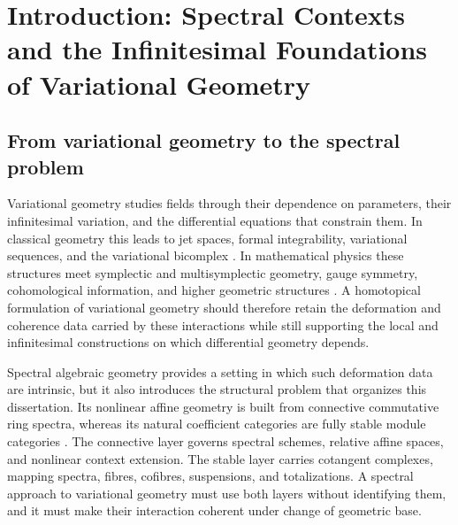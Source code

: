 \begingroup

\chapter*{Introduction: Spectral Contexts and the Infinitesimal Foundations of Variational Geometry}
{}

\setcounter{section}{0}
\renewcommand{\thesection}{\arabic{section}}
\makeatletter
{}
\makeatother


\section{From variational geometry to the spectral problem}
\label{sec:intro-programme}

Variational geometry studies fields through their dependence on parameters,
their infinitesimal variation, and the differential equations that constrain
them.  In classical geometry this leads to jet spaces, formal integrability,
variational sequences, and the variational bicomplex
\cite{Kock1980,Marvan1986,Vitolo2000,GiachettaMangiarottiSardanashvily2000,PuglieseSparanoVitagliano2023}.
In mathematical physics these structures meet symplectic and multisymplectic
geometry, gauge symmetry, cohomological information, and higher geometric
structures
\cite{Rogers2012,PTVV2013,Calaque2013,FiorenzaSatiSchreiber2013,FiorenzaRogersSchreiber2013,AlfonsiYoung2023}.
A homotopical formulation of variational geometry should therefore retain the
deformation and coherence data carried by these interactions while still
supporting the local and infinitesimal constructions on which differential
geometry depends.

Spectral algebraic geometry provides a setting in which such deformation data
are intrinsic, but it also introduces the structural problem that organizes
this dissertation.  Its nonlinear affine geometry is built from connective
commutative ring spectra, whereas its natural coefficient categories are
fully stable module categories
\cite{LurieHigherAlgebra,LurieSAG}.  The connective layer governs spectral
schemes, relative affine spaces, and nonlinear context extension.  The stable
layer carries cotangent complexes, mapping spectra, fibres, cofibres,
suspensions, and totalizations.  A spectral approach to variational geometry
must use both layers without identifying them, and it must make their
interaction coherent under change of geometric base.

